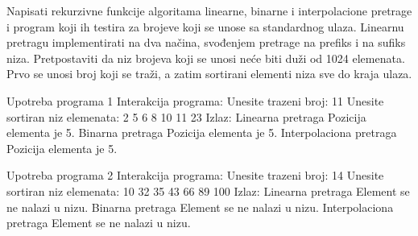 \begin{Answer}[ref=401]
\end{Answer}

\begin{Exercise}[label=402]
  Napisati rekurzivne funkcije algoritama linearne, binarne i
  interpolacione pretrage i program koji ih testira za brojeve koji se
  unose sa standardnog ulaza. Linearnu pretragu implementirati na dva
  načina, svođenjem pretrage na prefiks i na sufiks
  niza. Pretpostaviti da niz brojeva koji se unosi neće biti duži od
  1024 elemenata. Prvo se unosi broj koji se traži, a zatim sortirani
  elementi niza sve do kraja ulaza.

\begin{miditest}
\begin{test}{Upotreba programa 1}
Interakcija programa:
  Unesite trazeni broj: 11
  Unesite sortiran niz elemenata: 
  2 5 6 8 10 11 23
Izlaz:
  Linearna pretraga
  Pozicija elementa je 5.
  Binarna pretraga
  Pozicija elementa je 5.
  Interpolaciona pretraga
  Pozicija elementa je 5.
\end{test}
\end{miditest}
\begin{miditest}
\begin{test}{Upotreba programa 2}
Interakcija programa:
  Unesite trazeni broj: 14
  Unesite sortiran niz elemenata:
  10 32 35 43 66 89 100
Izlaz:
  Linearna pretraga
  Element se ne nalazi u nizu.
  Binarna pretraga
  Element se ne nalazi u nizu.
  Interpolaciona pretraga
  Element se ne nalazi u nizu.
\end{test}
\end{miditest}


\end{Exercise}

